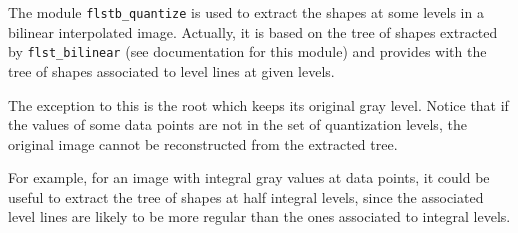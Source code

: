 The module \texttt{flstb\_quantize} is used to extract the shapes at some levels
in a bilinear interpolated image. Actually, it is based on the tree of shapes
extracted by \texttt{flst\_bilinear} (see documentation for this module) and
provides with the tree of shapes associated to level lines at given levels.

The exception to this is the root which keeps its original gray level.
Notice that if the values of some data points are not in the set of
quantization levels, the original image cannot be reconstructed from the
extracted tree.

For example, for an image with integral gray values at data points, it could
be useful to extract the tree of shapes at half integral levels, since the
associated level lines are likely to be more regular than the ones associated
to integral levels.
